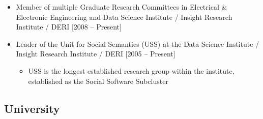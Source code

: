 \documentclass[10pt,a4paper]{res} %
\begin{document}
\begin{resume}
\begin{itemize}
\item Member of multiple Graduate Research Committees in Electrical \& Electronic Engineering and Data Science Institute / Insight Research Institute / DERI [2008 -- Present]
\item Leader of the Unit for Social Semantics (USS) at the Data Science Institute / Insight Research Institute / DERI [2005 -- Present]
\begin{itemize} \itemsep -2pt
\item USS is the longest established research group within the institute, established as the Social Software Subcluster
\end{itemize}
\end{itemize}

\subsection*{University}


\end{resume}
\end{document}

